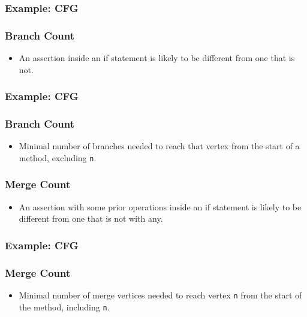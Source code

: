 \documentclass{beamer}
\begin{document}
\begin{frame}
  \frametitle{Example: CFG} {\Large	
     \vspace*{-1em}
     
	}
\end{frame}

\begin{frame}
   \frametitle{Branch Count} {\Large	
     \begin{itemize}
        \item An assertion inside an if statement is likely to be different from one that is not.
     \end{itemize}
	}
\end{frame}

\begin{frame}
  \frametitle{Example: CFG} {\Large	
     \vspace*{-1em}
     
	}
\end{frame}

\begin{frame}
   \frametitle{Branch Count} {\Large	
     \begin{itemize}
        \item Minimal number of branches needed to reach that vertex from the start of a method, excluding {\tt n}.
     \end{itemize}
	}
\end{frame}

\begin{frame}
   \frametitle{Merge Count} {\Large	
     \begin{itemize}
        \item An assertion with some prior operations inside an if statement is likely to be different from one that is not with any.
     \end{itemize}
	}
\end{frame}

\begin{frame}
  \frametitle{Example: CFG} {\Large	
     \vspace*{-1em}
     
	}
\end{frame}

\begin{frame}
   \frametitle{Merge Count} {\Large	
     \begin{itemize}
        \item Minimal number of merge vertices needed to reach vertex {\tt n} from the start of the method, including {\tt n}.
     \end{itemize}
	}
\end{frame}
\end{document}
